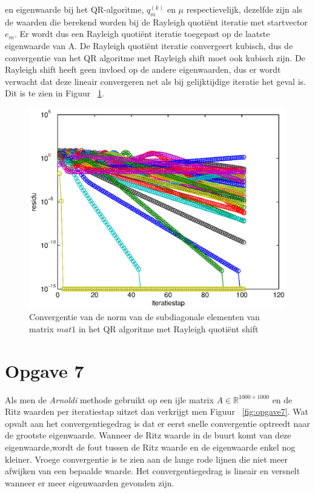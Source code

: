 \documentclass[a4paper]{article}
\newcommand{\opgave}[1]{\section*{Opgave #1}}
\begin{document}
en eigenwaarde bij het QR-algoritme, $q_m^{(k)}$ en $\mu$ respectievelijk, dezelfde zijn als de waarden
die berekend worden bij de Rayleigh quoti\"{e}nt iteratie met startvector $e_m$. Er wordt dus een Rayleigh quoti\"{e}nt iteratie toegepast op de laatste eigenwaarde van
A. De Rayleigh quoti\"{e}nt iteratie convergeert kubisch, dus de convergentie van het QR algoritme met Rayleigh shift moet ook kubisch zijn. De Rayleigh shift heeft geen invloed op de andere eigenwaarden, dus er wordt verwacht dat deze lineair convergeren net als bij gelijktijdige iteratie het geval is. Dit is te zien in Figuur ~\ref{fig:opgave6}.
\begin{figure}
\centerline{\includegraphics{pictures/opgave6.eps}}
\caption{Convergentie van de norm van de subdiagonale elementen van matrix $mat1$ in het QR algoritme met Rayleigh quoti\"{e}nt shift}
\label{fig:opgave6}
\end{figure}
\opgave{7}
Als men de \textit{Arnoldi} methode gebruikt op een ijle matrix $A \in \mathbb{R}^{1000\times1000}$ en de Ritz waarden per iteratiestap uitzet dan verkrijgt men Figuur ~\ref{fig:opgave7}.
Wat opvalt aan het convergentiegedrag is dat er eerst snelle convergentie optreedt naar de grootste eigenwaarde. Wanneer de Ritz waarde in de buurt komt van deze eigenwaarde,wordt de fout tussen de Ritz waarde en de eigenwaarde enkel nog kleiner. Vroege convergentie is te zien aan de lange rode lijnen die niet meer afwijken van een bepaalde waarde. Het convergentiegedrag is lineair en versnelt wanneer er meer eigenwaarden gevonden zijn.
\end{document}
